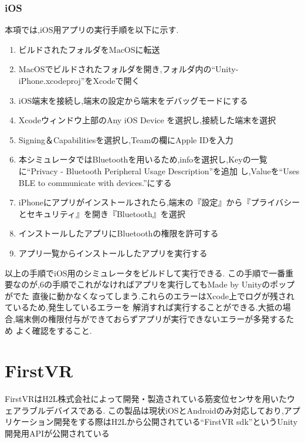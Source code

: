 \documentclass{ltjsreport}
\begin{document}
			\subsubsection{iOS}
				本項では,iOS用アプリの実行手順を以下に示す.
				\begin{enumerate}
					\item ビルドされたフォルダをMacOSに転送
					\item MacOSでビルドされたフォルダを開き,フォルダ内の``Unity-iPhone.xcodeproj''をXcodeで開く
					\item iOS端末を接続し,端末の設定から端末をデバッグモードにする
					\item Xcodeウィンドウ上部のAny iOS Device を選択し,接続した端末を選択
					\item Signing＆Capabilitiesを選択し,Teamの欄にApple IDを入力
					\item 本シミュレータではBluetoothを用いるため,infoを選択し,Keyの一覧に``Privacy - Bluetooth Peripheral Usage Description''を追加
						し,Valueを``Uses BLE to communicate with devices.''にする
					\item iPhoneにアプリがインストールされたら,端末の『設定』から『プライバシーとセキュリティ』を開き『Bluetooth』を選択
					\item インストールしたアプリにBluetoothの権限を許可する
					\item アプリ一覧からインストールしたアプリを実行する
				\end{enumerate}
				以上の手順でiOS用のシミュレータをビルドして実行できる.
				この手順で一番重要なのが,6の手順でこれがなければアプリを実行してもMade by Unityのポップがでた
				直後に動かなくなってしまう.これらのエラーはXcode上でログが残されているため,発生しているエラーを
				解消すれば実行することができる.大抵の場合,端末側の権限付与ができておらずアプリが実行できないエラーが多発するため
				よく確認をすること.
	\section{FirstVR}
		FirstVRはH2L株式会社\cite{ref:5}によって開発・製造されている筋変位センサを用いたウェアラブルデバイスである.
		この製品は現状iOSとAndroidのみ対応しており,アプリケーション開発をする際はH2Lから公開されている``FirstVR sdk''というUnity開発用APIが公開されている
\end{document}
